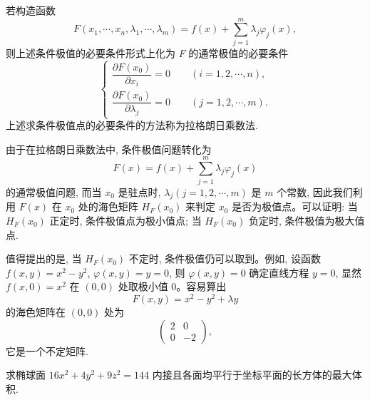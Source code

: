 \begin{remark}\label{remark:ma-14-source-110}
若构造函数
\[
  F(x_1,\cdots,x_n,\lambda_1,\cdots,\lambda_m)
  =
  f(x)+\sum_{j=1}^m\lambda_j\varphi_j(x),
\]
则上述条件极值的必要条件形式上化为 $F$ 的通常极值的必要条件
\begin{equation}
  \begin{cases}
    \dfrac{\partial F(x_0)}{\partial x_i}=0
    \qquad (i=1,2,\cdots,n),\\[1.2ex]
    \dfrac{\partial F(x_0)}{\partial\lambda_j}=0
    \qquad (j=1,2,\cdots,m).
  \end{cases}
  \label{eq:ma-14-5-9}
\end{equation}
上述求条件极值点的必要条件的方法称为拉格朗日乘数法.

由于在拉格朗日乘数法中, 条件极值问题转化为
\[
  F(x)=f(x)+\sum_{j=1}^m\lambda_j\varphi_j(x)
\]
的通常极值问题, 而当 $x_0$ 是驻点时, $\lambda_j(j=1,2,\cdots,m)$ 是 $m$ 个常数, 因此我们利用 $F(x)$ 在 $x_0$ 处的海色矩阵 $H_F(x_0)$ 来判定 $x_0$ 是否为极值点。可以证明: 当 $H_F(x_0)$ 正定时, 条件极值点为极小值点; 当 $H_F(x_0)$ 负定时, 条件极值为极大值点.

值得提出的是, 当 $H_F(x_0)$ 不定时, 条件极值仍可以取到。例如, 设函数 $f(x,y)=x^2-y^2$, $\varphi(x,y)=y=0$, 则 $\varphi(x,y)=0$ 确定直线方程 $y=0$, 显然 $f(x,0)=x^2$ 在 $(0,0)$ 处取极小值 $0$。容易算出
\[
  F(x,y)=x^2-y^2+\lambda y
\]
的海色矩阵在 $(0,0)$ 处为
\[
  \begin{pmatrix}
    2 & 0\\
    0 & -2
  \end{pmatrix},
\]
它是一个不定矩阵.
\end{remark}


\begin{example}\label{example:ma-14-5-4}
求椭球面 $16x^2+4y^2+9z^2=144$ 内接且各面均平行于坐标平面的长方体的最大体积.
\end{example}


